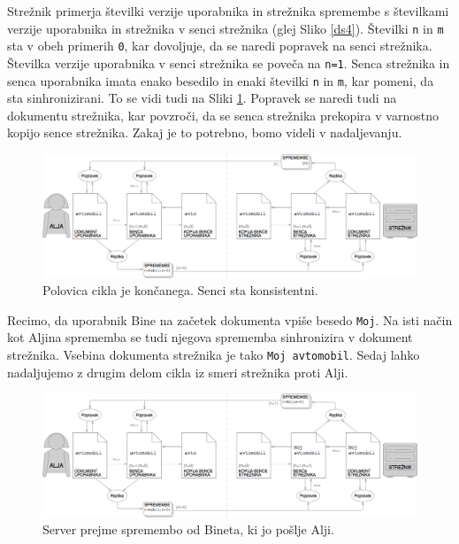 \documentclass[a4paper, 12pt, twoside]{book}
\begin{document}
Strežnik primerja številki verzije uporabnika in strežnika spremembe s številkami verzije uporabnika in strežnika v senci strežnika (glej Sliko \ref{ds4}). Številki {\tt n} in {\tt m} sta v obeh primerih {\tt 0}, kar dovoljuje, da se naredi popravek na senci strežnika. Številka verzije uporabnika v senci strežnika se poveča na {\tt n=1}. Senca strežnika in senca uporabnika imata enako besedilo in enaki številki {\tt n} in {\tt m}, kar pomeni, da sta sinhronizirani. To se vidi tudi na Sliki \ref{ds5}. Popravek se naredi tudi na dokumentu strežnika, kar povzroči, da se senca strežnika prekopira v varnostno kopijo sence strežnika. Zakaj je to potrebno, bomo videli v nadaljevanju.

\begin{figure}[placement h]
\begin{center}
\includegraphics[width=16cm]{ds5.png}
\end{center}
\caption{Polovica cikla je končanega. Senci sta konsistentni.}
\label{ds5}
\end{figure}

Recimo, da uporabnik Bine na začetek dokumenta vpiše besedo {\tt Moj}. Na isti način kot Aljina sprememba se tudi njegova sprememba sinhronizira v dokument strežnika. Vsebina dokumenta strežnika je tako {\tt Moj avtomobil}. Sedaj lahko nadaljujemo z drugim delom cikla iz smeri strežnika proti Alji.

\begin{figure}[placement h]
\begin{center}
\includegraphics[width=16cm]{ds6.png}
\end{center}
\caption{Server prejme spremembo od Bineta, ki jo pošlje Alji.}
\label{ds6}
\end{figure}
\end{document}
